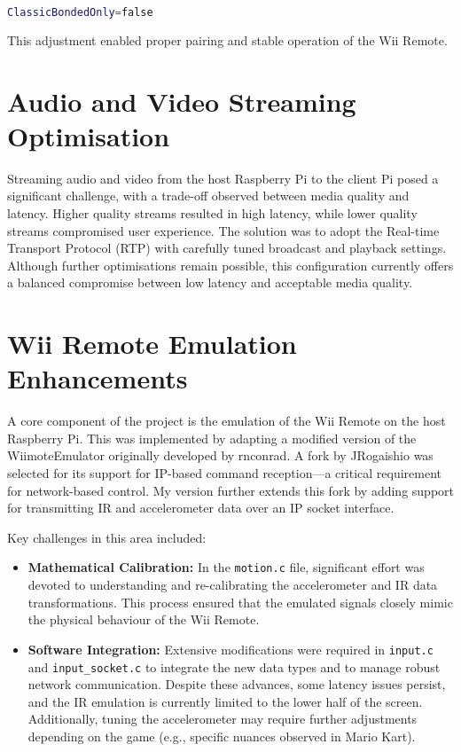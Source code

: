 \begin{lstlisting}[language=bash]
ClassicBondedOnly=false
\end{lstlisting}

This adjustment enabled proper pairing and stable operation of the Wii Remote.

\section{Audio and Video Streaming Optimisation}
Streaming audio and video from the host Raspberry Pi to the client Pi posed a significant challenge, with a trade-off observed between media quality and latency. Higher quality streams resulted in high latency, while lower quality streams compromised user experience. The solution was to adopt the Real-time Transport Protocol (RTP) with carefully tuned broadcast and playback settings. Although further optimisations remain possible, this configuration currently offers a balanced compromise between low latency and acceptable media quality.

\section{Wii Remote Emulation Enhancements}

A core component of the project is the emulation of the Wii Remote on the host Raspberry Pi. This was implemented by adapting a modified version of the WiimoteEmulator originally developed by rnconrad\cite{wiimote_emulator}. A fork by JRogaishio\cite{jr_wiimote_emu} was selected for its support for IP-based command reception—a critical requirement for network-based control. My version\cite{kf_wiimote_emu} further extends this fork by adding support for transmitting IR and accelerometer data over an IP socket interface.

Key challenges in this area included:
\begin{itemize}

\item \textbf{Mathematical Calibration:} In the \texttt{motion.c} file, significant effort was devoted to understanding and re-calibrating the accelerometer and IR data transformations. This process ensured that the emulated signals closely mimic the physical behaviour of the Wii Remote.

    \item \textbf{Software Integration:} Extensive modifications were required in \texttt{input.c} and \texttt{input\_socket.c} to integrate the new data types and to manage robust network communication. Despite these advances, some latency issues persist, and the IR emulation is currently limited to the lower half of the screen. Additionally, tuning the accelerometer may require further adjustments depending on the game (e.g., specific nuances observed in Mario Kart).

\end{itemize}


